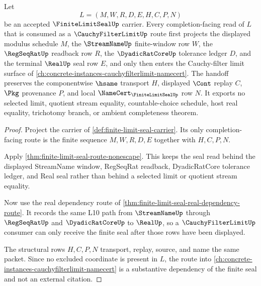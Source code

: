\begin{theorem}
\label{thm:finite-limit-seal-cauchy-filter-forward-route}
Let
$$
L=(M,W,R,D,E,H,C,P,N)
$$
be an accepted $\FiniteLimitSealUp$ carrier. Every completion-facing read of $L$ that is consumed as a $\CauchyFilterLimitUp$ route first projects the displayed modulus schedule $M$, the $\StreamNameUp$ finite-window row $W$, the $\RegSeqRatUp$ readback row $R$, the $\DyadicRatCoreUp$ tolerance ledger $D$, and the terminal $\RealUp$ seal row $E$, and only then enters the Cauchy-filter limit surface of \autoref{ch:concrete-instances-cauchyfilterlimit-namecert}. The handoff preserves the componentwise $\hsame$ transport $H$, displayed $\Cont$ replay $C$, $\Pkg$ provenance $P$, and local $\NameCert_{\FiniteLimitSealUp}$ row $N$. It exports no selected limit, quotient stream equality, countable-choice schedule, host real equality, trichotomy branch, or ambient completeness theorem.
\end{theorem}
\begin{proof}
Project the carrier of \autoref{def:finite-limit-seal-carrier}. Its only completion-facing route is the finite sequence $M,W,R,D,E$ together with $H,C,P,N$.

Apply \autoref{thm:finite-limit-seal-route-nonescape}. This keeps the seal read behind the displayed StreamName window, RegSeqRat readback, DyadicRatCore tolerance ledger, and Real seal rather than behind a selected limit or quotient stream equality.

Now use the real dependency route of \autoref{thm:finite-limit-seal-real-dependency-route}. It records the same L10 path from $\StreamNameUp$ through $\RegSeqRatUp$ and $\DyadicRatCoreUp$ to $\RealUp$, so a $\CauchyFilterLimitUp$ consumer can only receive the finite seal after those rows have been displayed.

The structural rows $H,C,P,N$ transport, replay, source, and name the same packet. Since no excluded coordinate is present in $L$, the route into \autoref{ch:concrete-instances-cauchyfilterlimit-namecert} is a substantive dependency of the finite seal and not an external citation.
\end{proof}

